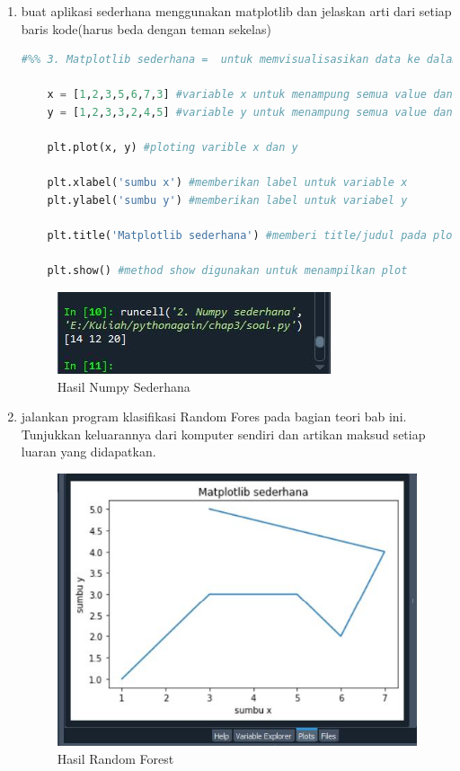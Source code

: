 \begin{enumerate}
\item buat aplikasi sederhana menggunakan matplotlib dan jelaskan arti dari setiap baris kode(harus beda dengan teman sekelas)
\begin{lstlisting}[language=Python]
    #%% 3. Matplotlib sederhana =  untuk memvisualisasikan data ke dalam bentuk grafik

    x = [1,2,3,5,6,7,3] #variable x untuk menampung semua value dan juga sebagai sumbu x
    y = [1,2,3,3,2,4,5] #variable y untuk menampung semua value dan juga sebagai sumbu y
    
    plt.plot(x, y) #ploting varible x dan y
    
    plt.xlabel('sumbu x') #memberikan label untuk variable x
    plt.ylabel('sumbu y') #memberikan label untuk variabel y
    
    plt.title('Matplotlib sederhana') #memberi title/judul pada plotting yang dibuat
    
    plt.show() #method show digunakan untuk menampilkan plot
\end{lstlisting}
\begin{figure}[!htbp]
    \centering
    \includegraphics[scale=0.5]{figures/numpySederhana.JPG}
	\caption{Hasil Numpy Sederhana}
\end{figure}

\item jalankan program klasifikasi Random Fores pada bagian teori bab ini. Tunjukkan keluarannya dari komputer sendiri dan artikan maksud setiap luaran yang didapatkan.
\begin{figure}[!htbp]
    \centering
    \includegraphics[scale=0.5]{figures/Mtplotlibsederhana.JPG}
	\caption{Hasil Random Forest}
\end{figure}


\end{enumerate}
